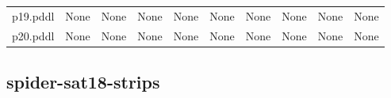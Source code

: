 \documentclass{article}
\begin{document}
\begin{tabular}{@{}lrrrrrrrrr@{}}
p19.pddl & \multicolumn{1}{|l|}{None} & \multicolumn{1}{|l|}{None} & \multicolumn{1}{|l|}{None} & \multicolumn{1}{|l|}{None} & \multicolumn{1}{|l|}{None} & \multicolumn{1}{|l|}{None} & \multicolumn{1}{|l|}{None} & \multicolumn{1}{|l|}{None} & \multicolumn{1}{|l|}{None} \\
p20.pddl & \multicolumn{1}{|l|}{None} & \multicolumn{1}{|l|}{None} & \multicolumn{1}{|l|}{None} & \multicolumn{1}{|l|}{None} & \multicolumn{1}{|l|}{None} & \multicolumn{1}{|l|}{None} & \multicolumn{1}{|l|}{None} & \multicolumn{1}{|l|}{None} & \multicolumn{1}{|l|}{None} \\
\end{tabular}

\hypertarget{cost-spider-sat18-strips}{}
\subsection*{spider-sat18-strips}
\end{document}
